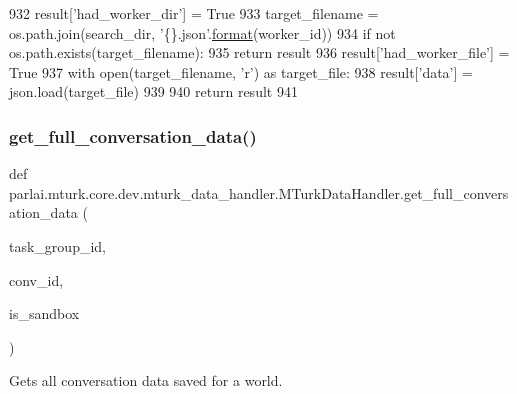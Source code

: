 \begin{DoxyCode}
932         result[\textcolor{stringliteral}{'had\_worker\_dir'}] = \textcolor{keyword}{True}
933         target\_filename = os.path.join(search\_dir, \textcolor{stringliteral}{'\{\}.json'}.\hyperlink{namespaceparlai_1_1chat__service_1_1services_1_1messenger_1_1shared__utils_a32e2e2022b824fbaf80c747160b52a76}{format}(worker\_id))
934         \textcolor{keywordflow}{if} \textcolor{keywordflow}{not} os.path.exists(target\_filename):
935             \textcolor{keywordflow}{return} result
936         result[\textcolor{stringliteral}{'had\_worker\_file'}] = \textcolor{keyword}{True}
937         with open(target\_filename, \textcolor{stringliteral}{'r') as target\_file:}
938 \textcolor{stringliteral}{            result['data'}] = json.load(target\_file)
939 
940         \textcolor{keywordflow}{return} result
941 
\end{DoxyCode}
\mbox{\label{classparlai_1_1mturk_1_1core_1_1dev_1_1mturk__data__handler_1_1MTurkDataHandler_af089c1fdb7266ba77936d53d957932f4}} 
\subsubsection{\texorpdfstring{get\+\_\+full\+\_\+conversation\+\_\+data()}{get\_full\_conversation\_data()}}
{\footnotesize\ttfamily def parlai.\+mturk.\+core.\+dev.\+mturk\+\_\+data\+\_\+handler.\+M\+Turk\+Data\+Handler.\+get\+\_\+full\+\_\+conversation\+\_\+data (\begin{DoxyParamCaption}\item[{}]{task\+\_\+group\+\_\+id,  }\item[{}]{conv\+\_\+id,  }\item[{}]{is\+\_\+sandbox }\end{DoxyParamCaption})\hspace{0.3cm}{\ttfamily [static]}}

\begin{DoxyVerb}Gets all conversation data saved for a world.
\end{DoxyVerb}
 

